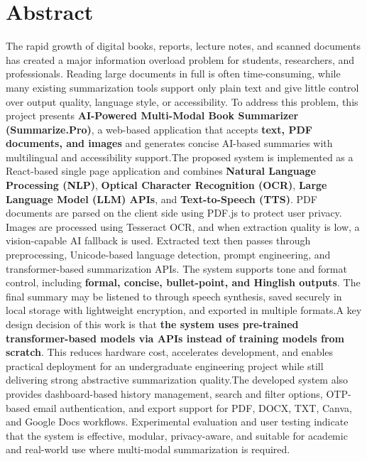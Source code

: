 \documentclass[12pt, a4paper]{report}
\begin{document}
\chapter*{Abstract}
\vspace{-1cm}
\titlerule
\vspace{0.2cm}

The rapid growth of digital books, reports, lecture notes, and scanned documents has created a major information overload problem for students, researchers, and professionals. Reading large documents in full is often time-consuming, while many existing summarization tools support only plain text and give little control over output quality, language style, or accessibility. To address this problem, this project presents \textbf{AI-Powered Multi-Modal Book Summarizer (Summarize.Pro)}, a web-based application that accepts \textbf{text, PDF documents, and images} and generates concise AI-based summaries with multilingual and accessibility support.The proposed system is implemented as a React-based single page application and combines \textbf{Natural Language Processing (NLP)}, \textbf{Optical Character Recognition (OCR)}, \textbf{Large Language Model (LLM) APIs}, and \textbf{Text-to-Speech (TTS)}. PDF documents are parsed on the client side using PDF.js to protect user privacy. Images are processed using Tesseract OCR, and when extraction quality is low, a vision-capable AI fallback is used. Extracted text then passes through preprocessing, Unicode-based language detection, prompt engineering, and transformer-based summarization APIs. The system supports tone and format control, including \textbf{formal, concise, bullet-point, and Hinglish outputs}. The final summary may be listened to through speech synthesis, saved securely in local storage with lightweight encryption, and exported in multiple formats.A key design decision of this work is that \textbf{the system uses pre-trained transformer-based models via APIs instead of training models from scratch}. This reduces hardware cost, accelerates development, and enables practical deployment for an undergraduate engineering project while still delivering strong abstractive summarization quality.The developed system also provides dashboard-based history management, search and filter options, OTP-based email authentication, and export support for PDF, DOCX, TXT, Canva, and Google Docs workflows. Experimental evaluation and user testing indicate that the system is effective, modular, privacy-aware, and suitable for academic and real-world use where multi-modal summarization is required.
\end{document}
